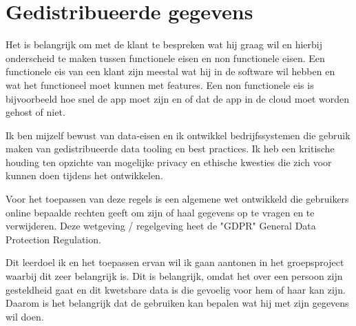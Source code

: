 \section{Gedistribueerde gegevens}\label{sec:gedistribueerde-gegevens}

Het is belangrijk om met de klant te bespreken wat hij graag wil en hierbij onderscheid te maken tussen functionele
eisen en non functionele eisen.
Een functionele eis van een klant zijn meestal wat hij in de software wil hebben en wat het functioneel moet kunnen met features.
Een non functionele eis is bijvoorbeeld hoe snel de app moet zijn en of dat de app in de cloud moet worden gehost of
niet.

Ik ben mijzelf bewust van data-eisen en ik ontwikkel bedrijfssystemen die gebruik maken van gedistribueerde
data tooling en best practices.
Ik heb een kritische houding ten opzichte van mogelijke privacy en ethische kwesties die zich voor kunnen doen
tijdens het ontwikkelen.

Voor het toepassen van deze regels is een algemene wet ontwikkeld die gebruikers online bepaalde rechten geeft om zijn of haal gegevens op te vragen en te verwijderen.
Deze wetgeving / regelgeving heet de "GDPR" General Data Protection Regulation.

Dit leerdoel ik en het toepassen ervan wil ik gaan aantonen in het groepsproject waarbij dit zeer belangrijk is.
Dit is belangrijk, omdat het over een persoon zijn gesteldheid gaat en dit kwetsbare data is die gevoelig voor hem of haar kan zijn.
Daarom is het belangrijk dat de gebruiken kan bepalen wat hij met zijn gegevens wil doen.


